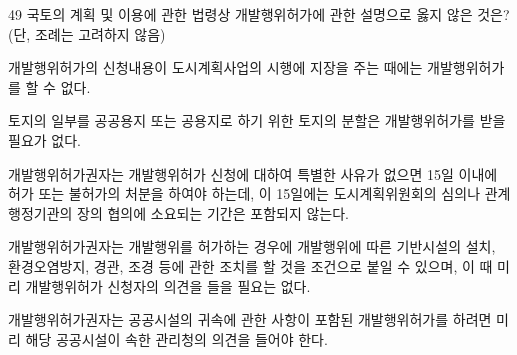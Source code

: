 \begin{question}{49}
국토의 계획 및 이용에 관한 법령상 개발행위허가에 관한 설명으로 옳지 않은 것은? (단, 조례는 고려하지 않음)
\begin{choices}
  \item 개발행위허가의 신청내용이 도시계획사업의 시행에 지장을 주는 때에는 개발행위허가를 할 수 없다.
  \item 토지의 일부를 공공용지 또는 공용지로 하기 위한 토지의 분할은 개발행위허가를 받을 필요가 없다.
  \item 개발행위허가권자는 개발행위허가 신청에 대하여 특별한 사유가 없으면 15일 이내에 허가 또는 불허가의 처분을 하여야 하는데, 이 15일에는 도시계획위원회의 심의나 관계행정기관의 장의 협의에 소요되는 기간은 포함되지 않는다.
  \item 개발행위허가권자는 개발행위를 허가하는 경우에 개발행위에 따른 기반시설의 설치, 환경오염방지, 경관, 조경 등에 관한 조치를 할 것을 조건으로 붙일 수 있으며, 이 때 미리 개발행위허가 신청자의 의견을 들을 필요는 없다.
  \item 개발행위허가권자는 공공시설의 귀속에 관한 사항이 포함된 개발행위허가를 하려면 미리 해당 공공시설이 속한 관리청의 의견을 들어야 한다.
\end{choices}
\end{question}
